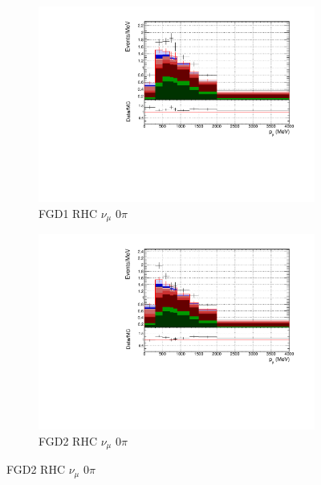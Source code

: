 \begin{figure}[!h]
\begin{subfigure}{0.49\textwidth}
  \centering
  \includegraphics[width=\textwidth]{figs/FGD1_NuMuBkg_CC0pi_in_AntiNu_Mode_p}
  \caption{FGD1 RHC $\nu_{\mu}$ 0$\pi$}
\end{subfigure}
\begin{subfigure}{0.49\textwidth}
  \centering
  \includegraphics[width=\textwidth]{figs/FGD2_NuMuBkg_CC0pi_in_AntiNu_Mode_p}
  \caption{FGD2 RHC $\nu_{\mu}$ 0$\pi$}
\end{subfigure}


\end{figure}
